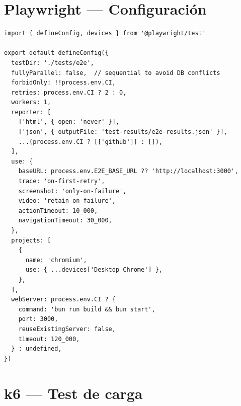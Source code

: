\section{Playwright — Configuración}

\begin{lstlisting}[style=ts,caption={playwright.config.ts}]
import { defineConfig, devices } from '@playwright/test'

export default defineConfig({
  testDir: './tests/e2e',
  fullyParallel: false,  // sequential to avoid DB conflicts
  forbidOnly: !!process.env.CI,
  retries: process.env.CI ? 2 : 0,
  workers: 1,
  reporter: [
    ['html', { open: 'never' }],
    ['json', { outputFile: 'test-results/e2e-results.json' }],
    ...(process.env.CI ? [['github']] : []),
  ],
  use: {
    baseURL: process.env.E2E_BASE_URL ?? 'http://localhost:3000',
    trace: 'on-first-retry',
    screenshot: 'only-on-failure',
    video: 'retain-on-failure',
    actionTimeout: 10_000,
    navigationTimeout: 30_000,
  },
  projects: [
    {
      name: 'chromium',
      use: { ...devices['Desktop Chrome'] },
    },
  ],
  webServer: process.env.CI ? {
    command: 'bun run build && bun start',
    port: 3000,
    reuseExistingServer: false,
    timeout: 120_000,
  } : undefined,
})
\end{lstlisting}

\section{k6 — Test de carga}

